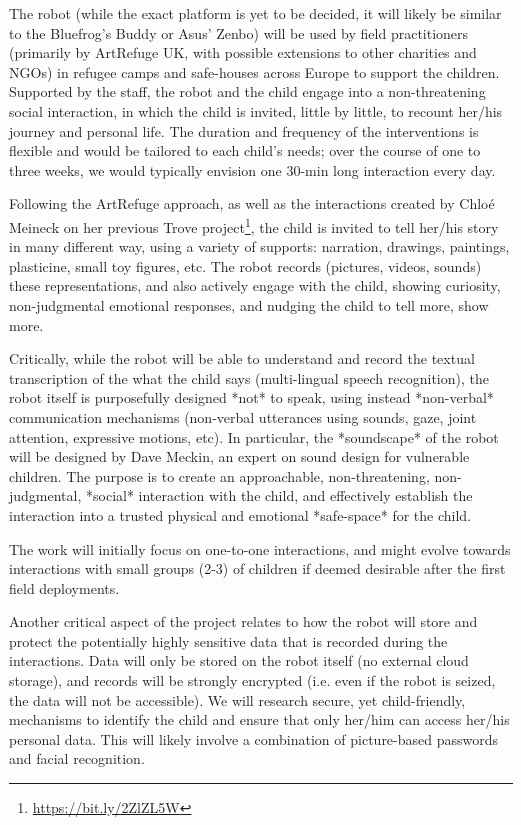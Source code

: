 \documentclass[11pt]{article}
\begin{document}
The robot (while the exact platform is yet to be decided, it will likely be
similar to the Bluefrog's Buddy or Asus' Zenbo) will be used by field
practitioners (primarily by ArtRefuge UK, with possible extensions to other
charities and NGOs) in refugee camps and safe-houses across Europe to support
the children. Supported by the staff, the robot and the child engage into a
non-threatening social interaction, in which the child is invited, little by
little, to recount her/his journey and personal life. The duration and frequency
of the interventions is flexible and would be tailored to each child's needs;
over the course of one to three weeks, we would typically envision one 30-min
long interaction every day.

Following the ArtRefuge approach, as well as the interactions created by Chloé
Meineck on her previous Trove project\footnote{\url{https://bit.ly/2ZlZL5W}},
the child is invited to tell her/his story in many different way, using a
variety of supports: narration, drawings, paintings, plasticine, small toy
figures, etc.  The robot records (pictures, videos, sounds) these
representations, and also actively engage with the child, showing curiosity,
non-judgmental emotional responses, and nudging the child to tell more, show
more.

Critically, while the robot will be able to understand and record the textual
transcription of the what the child says (multi-lingual speech recognition),
the robot itself is purposefully designed *not* to speak, using instead *non-verbal*
communication mechanisms (non-verbal utterances using sounds, gaze, joint
attention, expressive motions, etc). In particular, the *soundscape* of the
robot will be designed by Dave Meckin, an expert on sound design for vulnerable
children. The purpose is to create an approachable, non-threatening,
non-judgmental, *social* interaction with the child, and effectively establish
the interaction into a trusted physical and emotional *safe-space* for the
child.

The work will initially focus on one-to-one interactions, and might evolve
towards interactions with small groups (2-3) of children if deemed desirable
after the first field deployments.

Another critical aspect of the project relates to how the robot will store and
protect the potentially highly sensitive data that is recorded during the
interactions. Data will only be stored on the robot itself (no external cloud
storage), and records will be strongly encrypted (i.e. even if the robot is
seized, the data will not be accessible). We will research secure, yet
child-friendly, mechanisms to identify the child and ensure that only her/him
can access her/his personal data. This will likely involve a combination of
picture-based passwords and facial recognition.
\end{document}

